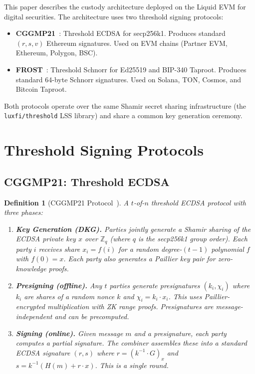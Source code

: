 \documentclass[11pt,a4paper]{article}
\newtheorem{definition}{Definition}[section]
\begin{document}
This paper describes the custody architecture deployed on the Liquid
EVM for digital securities.  The architecture uses two threshold
signing protocols:

\begin{itemize}[nosep]
  \item \textbf{CGGMP21}~\cite{cggmp21}: Threshold ECDSA for
        secp256k1.  Produces standard $(r, s, v)$ Ethereum signatures.
        Used on EVM chains (Partner EVM, Ethereum, Polygon, BSC).
  \item \textbf{FROST}~\cite{frost}: Threshold Schnorr for Ed25519
        and BIP-340 Taproot.  Produces standard 64-byte Schnorr
        signatures.  Used on Solana, TON, Cosmos, and Bitcoin Taproot.
\end{itemize}

Both protocols operate over the same Shamir secret sharing
infrastructure (the \texttt{luxfi/threshold} LSS library) and share
a common key generation ceremony.

\section{Threshold Signing Protocols}
\label{sec:protocols}

\subsection{CGGMP21: Threshold ECDSA}

\begin{definition}[CGGMP21 Protocol~\cite{cggmp21}]
A $t$-of-$n$ threshold ECDSA protocol with three phases:
\begin{enumerate}[nosep]
  \item \textbf{Key Generation (DKG).}  Parties jointly generate a
        Shamir sharing of the ECDSA private key $x$ over
        $\mathbb{Z}_q$ (where $q$ is the secp256k1 group order).
        Each party $i$ receives share $x_i = f(i)$ for a random
        degree-$(t{-}1)$ polynomial $f$ with $f(0) = x$.  Each party
        also generates a Paillier key pair for zero-knowledge proofs.
  \item \textbf{Presigning (offline).}  Any $t$ parties generate
        presignatures $(k_i, \chi_i)$ where $k_i$ are shares of a
        random nonce $k$ and $\chi_i = k_i \cdot x_i$.  This uses
        Paillier-encrypted multiplication with ZK range proofs.
        Presignatures are message-independent and can be precomputed.
  \item \textbf{Signing (online).}  Given message $m$ and a
        presignature, each party computes a partial signature.  The
        combiner assembles these into a standard ECDSA signature
        $(r, s)$ where $r = (k^{-1} \cdot G)_x$ and
        $s = k^{-1}(H(m) + r \cdot x)$.  This is a single round.
\end{enumerate}
\end{definition}
\end{document}
